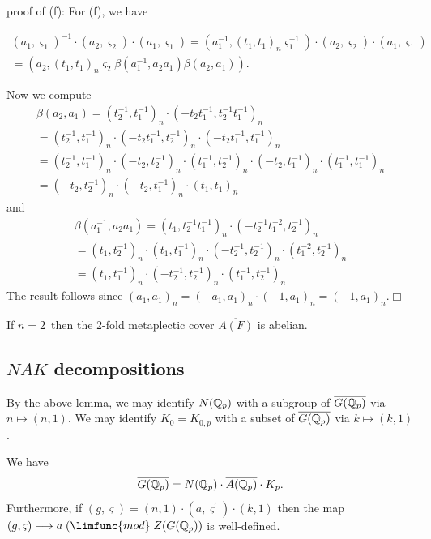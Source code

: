 proof of (f):
For (f), we have

\[
\begin{array}{c}
(a_1,\varsigma _1)^{-1}\cdot (a_2,\varsigma _2)\cdot (a_1,\varsigma
_1)=(a_1^{-1},(t_1,t_1)_n\varsigma _1^{-1})\cdot (a_2,\varsigma _2)\cdot
(a_1,\varsigma _1) \\
=(a_2,(t_1,t_1)_n\varsigma _2\beta (a_1^{-1},a_2a_1)\beta (a_2,a_1)).
\end{array}
\]

Now we compute
\[
\begin{array}{c}
\beta (a_2,a_1)=(t_2^{-1},t_1^{-1})_n\cdot (-t_2t_1^{-1},t_2^{-1}t_1^{-1})_n
\\
=(t_2^{-1},t_1^{-1})_n\cdot (-t_2t_1^{-1},t_2^{-1})_n\cdot
(-t_2t_1^{-1},t_1^{-1})_n \\
=(t_2^{-1},t_1^{-1})_n\cdot (-t_2,t_2^{-1})_n\cdot
(t_1^{-1},t_2^{-1})_n\cdot (-t_2,t_1^{-1})_n\cdot (t_1^{-1},t_1^{-1})_n \\
=(-t_2,t_2^{-1})_n\cdot (-t_2,t_1^{-1})_n\cdot (t_1,t_1)_n
\end{array}
\]
and
\[
\begin{array}{c}
\beta (a_1^{-1},a_2a_1)=(t_1,t_2^{-1}t_1^{-1})_n\cdot
(-t_2^{-1}t_1^{-2},t_2^{-1})_n \\
=(t_1,t_2^{-1})_n\cdot (t_1,t_1^{-1})_n\cdot (-t_2^{-1},t_2^{-1})_n\cdot
(t_1^{-2},t_2^{-1})_n \\
=(t_1,t_1^{-1})_n\cdot (-t_2^{-1},t_2^{-1})_n\cdot (t_1^{-1},t_2^{-1})_n
\end{array}
\]
The result follows since $(a_1,a_1)_n=(-a_1,a_1)_n\cdot
(-1,a_1)_n=(-1,a_1)_n $.$\Box $

\begin{corollary}
If $n=2$\ then the 2-fold metaplectic cover $\overline{A(F)}$ is abelian.
\end{corollary}

\subsection{$NAK$ decompositions}

By the above lemma, we may identify $N({\Bbb{Q}}_p)$ with a subgroup of $%
\overline{G({\Bbb{Q}}_p)}$ via $n\longmapsto (n,1)$. We may identify $%
K_0=K_{0,p}$ with a subset of $\overline{G({\Bbb{Q}}_p)}$ via $k\longmapsto
(k,1)$. 

\begin{lemma}
We have 
\[
\overline{G({\Bbb{Q}}_p)}=N({\Bbb{Q}}_p)\cdot \overline{A({\Bbb{Q}}_p)}\cdot K_p.
\]
Furthermore, if $(g,\varsigma )=(n,1)\cdot (a,\varsigma ^{\prime })\cdot
(k,1)$ then the map $(g,\varsigma )\longmapsto a\;(\limfunc{mod}\;Z(G({\Bbb{Q}}%
_p))$ is well-defined.
\end{lemma}

